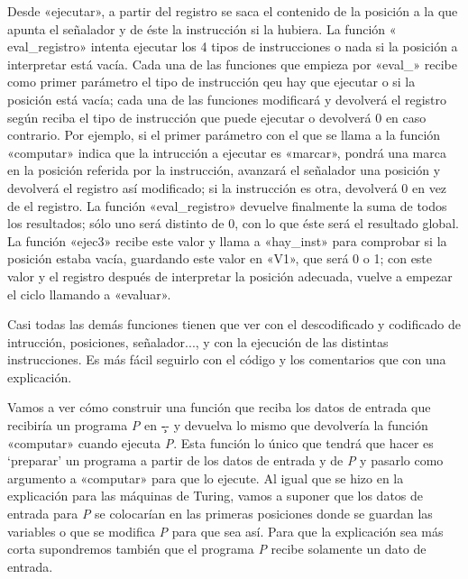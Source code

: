 Desde «{\fgabrielen ejecutar}», a partir del registro se saca el contenido de la posición a la que
apunta el señalador y de éste la instrucción si la hubiera. La función «{\fgabrielen
eval\_registro}» intenta ejecutar los 4 tipos de instrucciones o nada si la posición a interpretar
está vacía. Cada una de las funciones que empieza por «{\fgabrielen eval\_}» recibe como primer
parámetro el tipo de instrucción qeu hay que ejecutar o si la posición está vacía; cada una de las
funciones modificará y devolverá el registro según reciba el tipo de instrucción que puede ejecutar
o devolverá 0 en caso contrario. Por ejemplo, si el primer parámetro con el que se llama a la
función «{\fgabrielen computar}» indica que la intrucción a ejecutar es «marcar», pondrá una marca
en la posición referida por la instrucción, avanzará el señalador una posición y devolverá el
registro así modificado; si la instrucción es otra, devolverá 0 en vez de el registro. La función
«{\fgabrielen eval\_registro}» devuelve finalmente la suma de todos los resultados; sólo uno será
distinto de 0, con lo que éste será el resultado global. La función «{\fgabrielen ejec3}» recibe
este valor y llama a «{\fgabrielen hay\_inst}» para comprobar si la posición estaba vacía, guardando
este valor en «{\fgabrielen V1}», que será 0 o 1; con este valor y el registro después de
interpretar la posición adecuada, vuelve a empezar el ciclo llamando a «{\fgabrielen evaluar}».

Casi todas las demás funciones tienen que ver con el descodificado y codificado de intrucción,
posiciones, señalador..., y con la ejecución de las distintas instrucciones. Es más fácil seguirlo
con el código y los comentarios que con una explicación.

Vamos a ver cómo construir una función que reciba los datos de entrada que recibiría un programa
{\it P} en \c-- y devuelva lo mismo que devolvería la función «{\fgabrielen computar}» cuando
ejecuta {\it P}. Esta función lo único que tendrá que hacer es ‘preparar’ un programa a partir de
los datos de entrada y de {\it P} y pasarlo como argumento a «{\fgabrielen computar}» para que lo
ejecute. Al igual que se hizo en la explicación para las máquinas de Turing, vamos a suponer que los
datos de entrada para {\it P} se colocarían en las primeras posiciones donde se guardan las
variables o que se modifica {\it P} para que sea así. Para que la explicación sea más corta
supondremos también que el programa {\it P} recibe solamente un dato de entrada.

